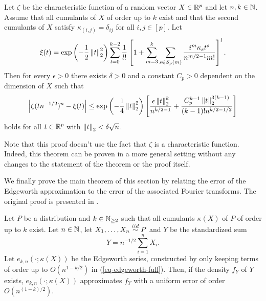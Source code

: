 \begin{theorem} \label{thm-edge-inv-tech}
    Let $\zeta$ be the characteristic function of a random vector $X \in {\mathbb{R}^p}$ and let $n, k \in \mathbb{N}$. Assume that all cumulants of $X$ of order up to $k$ exist and that the second cumulants of $X$ satisfy $\kappa_{(i, j)} = \delta_{ij}$ for all $i, j \in [p]$. Let
    \begin{equation} \label{eq-edgeworth-fourier}
        \xi(t) = \exp\left(-\frac{1}{2}\left\lVert t\right\rVert_2^2\right)\sum_{l=0}^{k-2} \frac{1}{l!} \left[ 1 + \sum_{m=3}^k \sum_{s \in S_p(m)} \frac{i^m\kappa_s t^s}{n^{m/2-1}m!} \right]^l.
    \end{equation}
    Then for every $\epsilon > 0$ there exists $\delta > 0$ and a constant $C_p > 0$ dependent on the dimension of $X$ such that 
    \begin{equation}\label{eq-edge-bound}
        \left|\zeta(t n^{-1/2})^n - \xi(t)\right| \leq \exp\left(-\frac{1}{4}\left\lVert t\right\rVert_2^2\right)\left[ \frac{\epsilon\left\lVert t\right\rVert_2^k}{n^{k/2-1}} + \frac{C_p^{k-1}\left\lVert t\right\rVert_2^{3(k-1)}}{(k-1)!n^{k/2-1/2}} \right]
    \end{equation}
    holds for all $t \in {\mathbb{R}^p}$ with $\left\lVert t\right\rVert_2 < \delta\sqrt{n}$.
\end{theorem}


Note that this proof doesn't use the fact that $\zeta$ is a characteristic function. Indeed, this theorem can be proven in a more general setting without any changes to the statement of the theorem or the proof itself.

We finally prove the main theorem of this section by relating the error of the Edgeworth approximation to the error of the associated Fourier transforms. The original proof is presented in \cite[Theorem 3.5.1]{kolassa2006series}.

\begin{theorem} \label{thm-edgeworth}
    Let $P$ be a distribution and $k \in \mathbb{N}_{\geq 2}$ such that all cumulants $\kappa(X)$ of $P$ of order up to $k$ exist. Let $n \in \mathbb{N}$, let $X_1, \ldots, X_n \stackrel{iid}{\sim} P$ and $Y$ be the standardized sum
    \begin{equation*}
        Y = n^{-1/2}\sum_{i=1}^n X_i.
    \end{equation*}
    Let $e_{k, n}(\cdot; \kappa(X))$ be the Edgeworth series, constructed by only keeping terms of order up to $O(n^{1-k/2})$ in (\ref{eq-edgeworth-full}). Then, if the density $f_Y$ of $Y$ exists, $e_{k, n}(\cdot; \kappa(X))$ approximates $f_Y$ with a uniform error of order $O(n^{(1 - k)/2})$.
\end{theorem}
